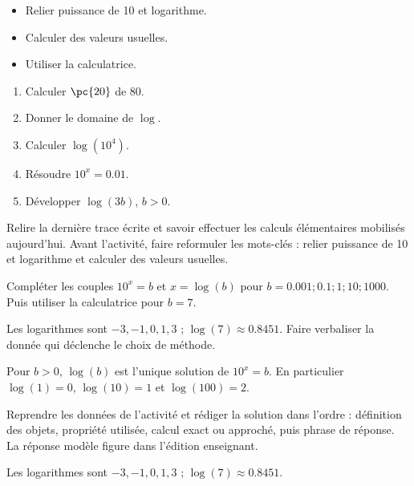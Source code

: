 \begin{objectives}\begin{itemize}\item Relier puissance de 10 et logarithme.\item Calculer des valeurs usuelles.\item Utiliser la calculatrice.\end{itemize}\end{objectives}
\begin{fluency}\begin{enumerate}\item Calculer $\pc{20}$ de $80$. \item Donner le domaine de $\log$. \mxblank{$]0,+\infty[$}\item Calculer $\log(10^4)$. \item Résoudre $10^x=\num{0,01}$. \item Développer $\log(3b)$, $b>0$. \end{enumerate}\end{fluency}
\begin{prerequisites}Relire la dernière trace écrite et savoir effectuer les calculs élémentaires mobilisés aujourd'hui. Avant l'activité, faire reformuler les mots-clés : relier puissance de 10 et logarithme et calculer des valeurs usuelles.\end{prerequisites}

\begin{activity}
Compléter les couples $10^x=b$ et $x=\log(b)$ pour $b=\num{0,001};\num{0,1};1;10;\num{1000}$. Puis utiliser la calculatrice pour $b=7$.

\end{activity}
\begin{solution}Les logarithmes sont $-3,-1,0,1,3$ ; $\log(7)\approx\num{0,8451}$. Faire verbaliser la donnée qui déclenche le choix de méthode.\end{solution}

\begin{summary}Pour $b>0$, $\log(b)$ est l'unique solution de $10^x=b$. En particulier $\log(1)=0$, $\log(10)=1$ et $\log(100)=2$.\end{summary}

\begin{example}
Reprendre les données de l'activité et rédiger la solution dans l'ordre : définition des objets, propriété utilisée, calcul exact ou approché, puis phrase de réponse. La réponse modèle figure dans l'édition enseignant.
\end{example}
\begin{solution}Les logarithmes sont $-3,-1,0,1,3$ ; $\log(7)\approx\num{0,8451}$.\end{solution}


